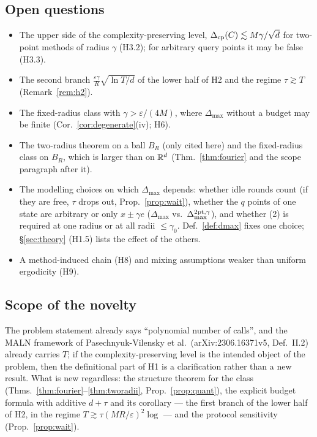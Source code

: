 \documentclass[11pt,a4paper]{article}
\numberwithin{equation}{section}
\theoremstyle{definition}
\theoremstyle{remark}
\newcommand{\Dmax}{\Delta_{\max}}\newcommand{\Dcp}{\Delta_{\rm cp}}
\begin{document}
\subsection{Open questions}
\begin{itemize}
\item The upper side of the complexity-preserving level, $\Dcp(C)\lesssim M\gamma/\sqrt d$ for two-point methods of radius $\gamma$ (H3.2); for arbitrary query points it may be false (H3.3).
\item The second branch $\frac{\varepsilon\gamma}R\sqrt{\ln T/d}$ of the lower half of H2 and the regime $\tau\gtrsim T$ (Remark~\ref{rem:h2}).
\item The fixed-radius class with $\gamma>\varepsilon/(4M)$, where $\Dmax$ without a budget may be finite (Cor.~\ref{cor:degenerate}(iv); H6).
\item The two-radius theorem on a ball $B_R$ (only cited here) and the fixed-radius class on $B_R$, which is larger than on $\mathbb R^d$ (Thm.~\ref{thm:fourier} and the scope paragraph after it).
\item The modelling choices on which $\Dmax$ depends: whether idle rounds count (if they are free, $\tau$ drops out, Prop.~\ref{prop:wait}), whether the $q$ points of one state are arbitrary or only $x\pm\gamma e$ ($\Dmax$ vs.\ $\Dmax^{2\rm pt,\gamma}$), and whether (2) is required at one radius or at all radii $\le\gamma_0$. Def.~\ref{def:dmax} fixes one choice; \S\ref{sec:theory} (H1.5) lists the effect of the others.
\item A method-induced chain (H8) and mixing assumptions weaker than uniform ergodicity (H9).
\end{itemize}

\subsection{Scope of the novelty}
The problem statement already says ``polynomial number of calls'', and the MALN framework of Pasechnyuk-Vilensky et al.\ (arXiv:2306.16371v5, Def.~II.2) already carries $T$; if the complexity-preserving level is the intended object of the problem, then the definitional part of H1 is a clarification rather than a new result. What is new regardless: the structure theorem for the class (Thms.~\ref{thm:fourier}--\ref{thm:tworadii}, Prop.~\ref{prop:quant}), the explicit budget formula with additive $d+\tau$ and its corollary --- the first branch of the lower half of H2, in the regime $T\gtrsim\tau(MR/\varepsilon)^2\log$ --- and the protocol sensitivity (Prop.~\ref{prop:wait}).
\end{document}
